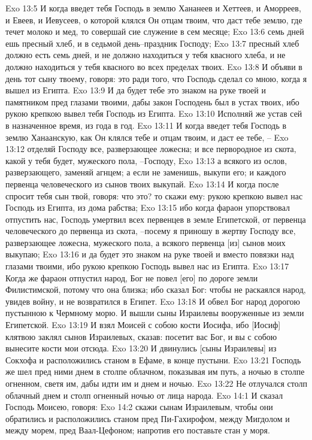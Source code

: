 Exo 13:5  И когда введет тебя Господь в землю Хананеев и Хеттеев, и Аморреев, и Евеев, и Иевусеев, о которой клялся Он отцам твоим, что даст тебе землю, где течет молоко и мед, то совершай сие служение в сем месяце;
Exo 13:6  семь дней ешь пресный хлеб, и в седьмой день--праздник Господу;
Exo 13:7  пресный хлеб должно есть семь дней, и не должно находиться у тебя квасного хлеба, и не должно находиться у тебя квасного во всех пределах твоих.
Exo 13:8  И объяви в день тот сыну твоему, говоря: это ради того, что Господь сделал со мною, когда я вышел из Египта.
Exo 13:9  И да будет тебе это знаком на руке твоей и памятником пред глазами твоими, дабы закон Господень был в устах твоих, ибо рукою крепкою вывел тебя Господь из Египта.
Exo 13:10  Исполняй же устав сей в назначенное время, из года в год.
Exo 13:11  И когда введет тебя Господь в землю Ханаанскую, как Он клялся тебе и отцам твоим, и даст ее тебе, --
Exo 13:12  отделяй Господу все, разверзающее ложесна; и все первородное из скота, какой у тебя будет, мужеского пола, --Господу,
Exo 13:13  а всякого из ослов, разверзающего, заменяй агнцем; а если не заменишь, выкупи его; и каждого первенца человеческого из сынов твоих выкупай.
Exo 13:14  И когда после спросит тебя сын твой, говоря: что это? то скажи ему: рукою крепкою вывел нас Господь из Египта, из дома рабства;
Exo 13:15  ибо когда фараон упорствовал отпустить нас, Господь умертвил всех первенцев в земле Египетской, от первенца человеческого до первенца из скота, --посему я приношу в жертву Господу все, разверзающее ложесна, мужеского пола, а всякого первенца [из] сынов моих выкупаю;
Exo 13:16  и да будет это знаком на руке твоей и вместо повязки над глазами твоими, ибо рукою крепкою Господь вывел нас из Египта.
Exo 13:17  Когда же фараон отпустил народ, Бог не повел [его] по дороге земли Филистимской, потому что она близка; ибо сказал Бог: чтобы не раскаялся народ, увидев войну, и не возвратился в Египет.
Exo 13:18  И обвел Бог народ дорогою пустынною к Чермному морю. И вышли сыны Израилевы вооруженные из земли Египетской.
Exo 13:19  И взял Моисей с собою кости Иосифа, ибо [Иосиф] клятвою заклял сынов Израилевых, сказав: посетит вас Бог, и вы с собою вынесите кости мои отсюда.
Exo 13:20  И двинулись [сыны Израилевы] из Сокхофа и расположились станом в Ефаме, в конце пустыни.
Exo 13:21  Господь же шел пред ними днем в столпе облачном, показывая им путь, а ночью в столпе огненном, светя им, дабы идти им и днем и ночью.
Exo 13:22  Не отлучался столп облачный днем и столп огненный ночью от лица народа.
Exo 14:1  И сказал Господь Моисею, говоря:
Exo 14:2  скажи сынам Израилевым, чтобы они обратились и расположились станом пред Пи-Гахирофом, между Мигдолом и между морем, пред Ваал-Цефоном; напротив его поставьте стан у моря.
